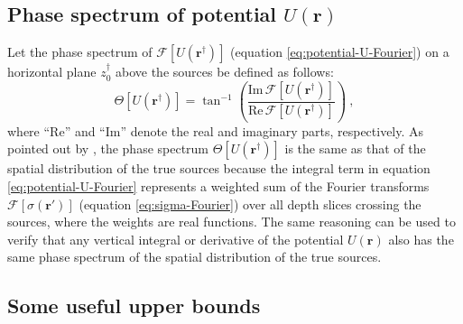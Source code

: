 \subsection{Phase spectrum of potential $U(\mathbf{r})$}
\label{subsec:potential-U-min-phase}

Let the phase spectrum \cite[e.g.,][ p. 261]{blakely1996} of  
$\mathcal{F} [ U(\mathbf{r}^{\dagger}) ]$ (equation \ref{eq:potential-U-Fourier}) 
on a horizontal plane $z^{\dagger}_{0}$ above the sources be defined as follows:
\begin{equation}
	\Theta [ U(\mathbf{r}^{\dagger}) ] = \tan^{-1} \left( 
	\frac{\text{Im} \, \mathcal{F} [ U(\mathbf{r}^{\dagger}) ]}{\text{Re} \, \mathcal{F} [ U(\mathbf{r}^{\dagger}) ]} 
	\right) \: ,
	\label{eq:potential-U-phase-spectrum}
\end{equation}
where ``$\text{Re}$'' and ``$\text{Im}$'' denote the real and imaginary parts, respectively.
As pointed out by \citet[][ p. 317]{blakely1996}, the phase spectrum $\Theta [ U(\mathbf{r}^{\dagger}) ]$ is the same
as that of the spatial distribution of the true sources because the integral term in equation \ref{eq:potential-U-Fourier}
represents a weighted sum of the Fourier transforms $\mathcal{F} [ \sigma(\mathbf{r}') ]$
(equation \ref{eq:sigma-Fourier}) over all depth slices crossing the sources,
where the weights are real functions.
The same reasoning can be used to verify that any vertical integral or derivative of the potential $U(\mathbf{r})$
also has the same phase spectrum of the spatial distribution of the true sources.

\subsection{Some useful upper bounds}
\label{subsec:upper-bounds}

